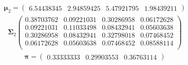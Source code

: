 \documentclass[11pt,a4paper]{article}
\newcommand{\bs}[1]{\boldsymbol{#1}}
\begin{document}
\begin{align} \bs{\mu}_{2} = \begin{pmatrix} 
6.54438345 & 2.94859425 & 5.47921795 & 1.98439211 
 \end{pmatrix}  \end{align} \vspace{-1cm} 
\begin{align} \bs{\Sigma}_{2}\begin{pmatrix} 
0.38703762 & 0.09221031 & 0.30286958 & 0.06172628 \\ 
0.09221031 & 0.11033498 & 0.08432941 & 0.05603638 \\ 
0.30286958 & 0.08432941 & 0.32798018 & 0.07468452 \\ 
0.06172628 & 0.05603638 & 0.07468452 & 0.08588114 \\ 
\end{pmatrix} \end{align}
\begin{align}  \bs{\pi} = \begin{pmatrix}
     0.33333333 & 0.29903553 & 0.36763114
\end{pmatrix} \end{align}

\newpage
\end{document}
